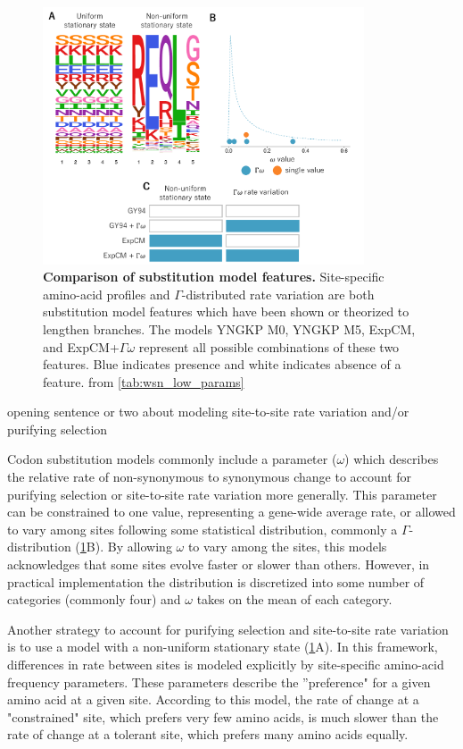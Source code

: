 \documentclass[11pt]{article}
\newcommand\skhcomment[1]{{\color{magenta}#1}}
\begin{document}
\begin{figure}[H]
\centerline{\includegraphics[width=0.85\textwidth]{figures/model_feature.pdf}}
\caption{\label{fig:model_feature}
\textbf{Comparison of substitution model features.}
Site-specific amino-acid profiles and $\Gamma$-distributed rate variation are both substitution model features which have been shown or theorized to lengthen branches. 
The models YNGKP M0, YNGKP M5, ExpCM, and ExpCM+$\Gamma\omega$ represent all possible combinations of these two features. 
Blue indicates presence and white indicates absence of a feature. 
from \ref{tab:wsn_low_params}
}
\end{figure}

\skhcomment{opening sentence or two about modeling site-to-site rate variation and/or purifying selection}

Codon substitution models commonly include a parameter ($\omega$) which describes the relative rate of non-synonymous to synonymous change to account for purifying selection or site-to-site rate variation more generally. 
This parameter can be constrained to one value, representing a gene-wide average rate, or allowed to vary among sites following some statistical distribution, commonly a $\Gamma$-distribution (\ref{fig:model_feature}B). 
By allowing $\omega$ to vary among the sites, this models acknowledges that some sites evolve faster or slower than others. 
However, in practical implementation the distribution is discretized into some number of categories (commonly four) and $\omega$ takes on the mean of each category. 

Another strategy to account for purifying selection and site-to-site rate variation is to use a model with a non-uniform stationary state (\ref{fig:model_feature}A). 
In this framework, differences in rate between sites is modeled explicitly by site-specific amino-acid frequency parameters. 
These parameters describe the ''preference" for a given amino acid at a given site. 
According to this model, the rate of change at a "constrained" site, which prefers very few amino acids, is much slower than the rate of change at a tolerant site, which prefers many amino acids equally. 
\end{document}
